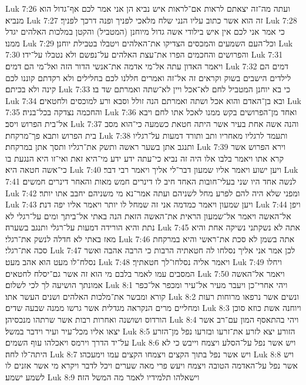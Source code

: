 Luk 7:26  ועתה מה־זה יצאתם לראות אם־לראות איש נביא הן אני אמר לכם אף־גדול הוא מנביא׃
Luk 7:27  זה הוא אשר כתוב עליו הנני שלח מלאכי לפניך ופנה דרכך לפניך׃
Luk 7:28  כי אמר אני לכם אין איש בילודי אשה גדול מיוחנן (המטביל) והקטן במלכות האלהים יגדל ממנו׃
Luk 7:29  וכל־העם השמעים והמכסים הצדיקו את־האלהים ויטבלו בטבילת יוחנן׃
Luk 7:30  והפרושים והחכמים הפרו את־עצת האלהים על־נפשם ולא נטבלו על־ידו׃
Luk 7:31  ויאמר האדון עתה אל־מי אדמה את־אנשי הדור הזה ואל־מי הם דמים׃
Luk 7:32  דמים הם לילדים הישבים בשוק וקראים זה אל־זה ואמרים חללנו לכם בחלילים ולא רקדתם קוננו לכם קינה ולא בכיתם׃
Luk 7:33  כי בא יוחנן המטביל לחם לא־אכל ויין לא־שתה ואמרתם שד בו׃
Luk 7:34  ובא בן־האדם והוא אכל ושתה ואמרתם הנה זולל וסבא ורע למוכסים ולחטאים׃
Luk 7:35  והחכמה נצדקה בכל־בניה׃
Luk 7:36  ואחד מן־הפרושים בקש ממנו לאכל אתו לחם ויבא אל־בית הפרוש ויסב׃
Luk 7:37  והנה אשה אחת בעיר אשר היתה חטאת כשמעה כי־הוא מסב בית הפרוש ותבא פך־מרקחת׃
Luk 7:38  ותעמד לרגליו מאחריו ותב ותורד דמעות על־רגליו ותנגב אתן בשער ראשה ותשק את־רגליו ותסך אתן במרקחת׃
Luk 7:39  וירא הפרוש אשר קרא אתו ויאמר בלבו אלו היה זה נביא כי־עתה ידע ידע מי־היא זאת ואי־זו היא הנגעת בו כי־אשה חטאה היא׃
Luk 7:40  ויען ישוע ויאמר אליו שמעון דבר־לי אליך ויאמר רבי דבר׃
Luk 7:41  לנשה אחד היו שני בעלי־חובות האחד חיב לו דינרים חמש מאות והאחר דינרים חמשים׃
Luk 7:42  ומפני שלא היה להם לפרע מחל לשניהם ועתה אמר־נא מי משניהם יחבב אתו יותר׃
Luk 7:43  ויען שמעון ויאמר כמדמה אני זה שמחל לו יותר ויאמר אליו יפה דנת׃
Luk 7:44  ויפן אל־האשה ויאמר אל־שמעון הראית את־האשה הזאת הנה באתי אל־ביתך ומים על־רגלי לא נתת והיא הורידה דמעות על־רגלי ותנגב בשערה׃
Luk 7:45  אתה לא נשקתני נשיקה אחת והיא מאז באתי לא חדלה לנשק את־רגלי׃
Luk 7:46  אתה בשמן לא סכת את־ראשי והיא במרקחת סכה את־רגלי׃
Luk 7:47  לכן אמר אני אליך נסלחו לה חטאתיה הרבות כי הרבה אהבה ואשר נסלח־לו מעט הוא אהב מעט׃
Luk 7:48  ויאמר אליה נסלחו־לך חטאתיך׃
Luk 7:49  ויחלו המסבים עמו לאמר בלבם מי הוא זה אשר גם־יסלח לחטאים׃
Luk 7:50  ויאמר אל־האשה אמונתך הושיעה לך לכי לשלום׃
Luk 8:1  ויהי אחרי־כן ויעבר מעיר אל־עיר ומכפר אל־כפר קורא ומבשר את־מלכות האלהים ושנים העשר אתו׃
Luk 8:2  ונשים אשר נרפאו מרוחות רעות ומחליים מרים הנקראה מגדלית אשר גרשו ממנה שבעה שדים׃
Luk 8:3  ויוחנה אשת כוזא סוכן הורדוס ושושנה ואחרות רבות אשר שרתהו מנכסיהן׃
Luk 8:4  ויהי בהתאסף המון עם־רב אשר יצאו אליו מכל־עיר ועיר וידבר במשל׃
Luk 8:5  הזורע יצא לזרע את־זרעו ובזרעו נפל מן־הזרע על־יד הדרך וירמס ויאכלהו עוף השמים׃
Luk 8:6  ויש אשר נפל על־הסלע ויצמח וייבש כי לא היתה־לו לחה׃
Luk 8:7  ויש אשר נפל בתוך הקצים ויצמחו הקצים עמו וימעכהו׃
Luk 8:8  ויש אשר נפל על־האדמה הטובה ויצמח ויעש פרי מאה שערים ויכל לדבר ויקרא מי אשר אזנים לו לשמע ישמע׃
Luk 8:9  וישאלהו תלמידיו לאמר מה המשל הזה׃
